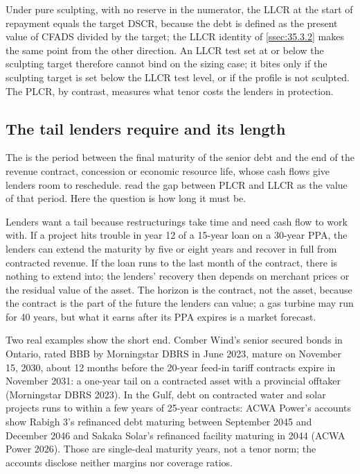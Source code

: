 Under pure sculpting, with no reserve in the numerator, the LLCR at the start of repayment equals the target DSCR, because the debt is defined as the present value of CFADS divided by the target; the LLCR identity of \cref{ssec:35.3.2} makes the same point from the other direction. An LLCR test set at or below the sculpting target therefore cannot bind on the sizing case; it bites only if the sculpting target is set below the LLCR test level, or if the profile is not sculpted. The PLCR, by contrast, measures what tenor costs the lenders in protection.

\subsection{The tail lenders require and its length}\label{ssec:36.5.2}

The  is the period between the final maturity of the senior debt and the end of the revenue contract, concession or economic resource life, whose cash flows give lenders room to reschedule.  read the gap between PLCR and LLCR as the value of that period. Here the question is how long it must be.

Lenders want a tail because restructurings take time and need cash flow to work with. If a project hits trouble in year 12 of a 15-year loan on a 30-year PPA, the lenders can extend the maturity by five or eight years and recover in full from contracted revenue. If the loan runs to the last month of the contract, there is nothing to extend into; the lenders' recovery then depends on merchant prices or the residual value of the asset. The horizon is the contract, not the asset, because the contract is the part of the future the lenders can value; a gas turbine may run for 40 years, but what it earns after its PPA expires is a market forecast.

Two real examples show the short end. Comber Wind's senior secured bonds in Ontario, rated BBB by Morningstar DBRS in June 2023, mature on November 15, 2030, about 12 months before the 20-year feed-in tariff contracts expire in November 2031: a one-year tail on a contracted asset with a provincial offtaker (Morningstar DBRS 2023). In the Gulf, debt on contracted water and solar projects runs to within a few years of 25-year contracts: ACWA Power's accounts show Rabigh 3's refinanced debt maturing between September 2045 and December 2046 and Sakaka Solar's refinanced facility maturing in 2044 (ACWA Power 2026). Those are single-deal maturity years, not a tenor norm; the accounts disclose neither margins nor coverage ratios.

